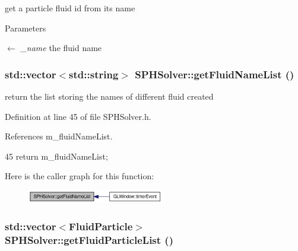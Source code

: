 get a particle fluid id from its name 


\begin{DoxyParams}{Parameters}
\item[\mbox{$\leftarrow$} {\em \_\-name}]the fluid name \end{DoxyParams}
\hypertarget{class_s_p_h_solver_aa73e68cd39ecbc3e0c868315b1699fcb}{
\subsubsection[{getFluidNameList}]{\setlength{\rightskip}{0pt plus 5cm}std::vector$<$std::string$>$ SPHSolver::getFluidNameList ()}}
\label{class_s_p_h_solver_aa73e68cd39ecbc3e0c868315b1699fcb}


return the list storing the names of different fluid created 



Definition at line 45 of file SPHSolver.h.



References m\_\-fluidNameList.




\begin{DoxyCode}
45 {return m_fluidNameList;}
\end{DoxyCode}




Here is the caller graph for this function:\nopagebreak
\begin{figure}[H]
\begin{center}
\leavevmode
\includegraphics[width=169pt]{class_s_p_h_solver_aa73e68cd39ecbc3e0c868315b1699fcb_icgraph}
\end{center}
\end{figure}


\hypertarget{class_s_p_h_solver_ad389df7449294b5a8de1fc163acbf29b}{
\subsubsection[{getFluidParticleList}]{\setlength{\rightskip}{0pt plus 5cm}std::vector$<${\bf FluidParticle}$>$ SPHSolver::getFluidParticleList ()}}
\label{class_s_p_h_solver_ad389df7449294b5a8de1fc163acbf29b}


